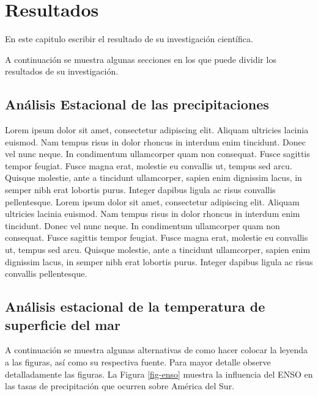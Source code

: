 \chapter{Resultados}
\label{cap4}


En este capitulo escribir el resultado de su investigación científica.

A continuación se muestra algunas secciones en los que puede dividir los resultados de su investigación.

\section{Análisis Estacional de las precipitaciones}

Lorem ipsum dolor sit amet, consectetur adipiscing elit. Aliquam ultricies lacinia euismod. Nam tempus risus in dolor rhoncus in interdum enim tincidunt. Donec vel nunc neque. In condimentum ullamcorper quam non consequat. Fusce sagittis tempor feugiat. Fusce magna erat, molestie eu convallis ut, tempus sed arcu. Quisque molestie, ante a tincidunt ullamcorper, sapien enim dignissim lacus, in semper nibh erat lobortis purus. Integer dapibus ligula ac risus convallis pellentesque. Lorem ipsum dolor sit amet, consectetur adipiscing elit. Aliquam ultricies lacinia euismod. Nam tempus risus in dolor rhoncus in interdum enim tincidunt. Donec vel nunc neque. In condimentum ullamcorper quam non consequat. Fusce sagittis tempor feugiat. Fusce magna erat, molestie eu convallis ut, tempus sed arcu. Quisque molestie, ante a tincidunt ullamcorper, sapien enim dignissim lacus, in semper nibh erat lobortis purus. Integer dapibus ligula ac risus convallis pellentesque.

\section{Análisis estacional de la temperatura de superficie del mar}


A continuación se muestra algunas alternativas de como hacer colocar la leyenda a las figuras, así como su respectiva fuente. Para mayor detalle observe detalladamente las figuras. La Figura \ref{fig-enso} muestra la influencia del ENSO en las tasas de precipitación que ocurren sobre América del Sur. 


